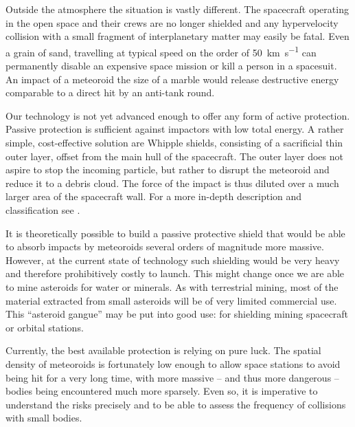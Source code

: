 
    Outside the atmosphere the situation is vastly different.
    The spacecraft operating in the open space and their crews are no longer shielded
    and any hypervelocity collision with a small fragment of interplanetary matter may easily be fatal.
    Even a grain of sand, travelling at typical speed on the order of \SI{50}{\kilo\metre\per\second} can permanently disable
    an expensive space mission or kill a person in a spacesuit.
    An impact of a meteoroid the size of a marble would release
    destructive energy comparable to a direct hit by an anti-tank round.

    Our technology is not yet advanced enough to offer any form of active protection.
    Passive protection is sufficient against impactors with low total energy.
    A rather simple, cost-effective solution are Whipple shields, consisting of a sacrificial thin outer layer,
    offset from the main hull of the spacecraft.
    The outer layer does not aspire to stop the incoming particle,
    but rather to disrupt the meteoroid and reduce it to a debris cloud.
    The force of the impact is thus diluted over a much larger area of the spacecraft wall.
    For a more in-depth description and classification see \citet{nasa-shield}.

    It is theoretically possible to build a passive protective shield that would be able to absorb impacts
    by meteoroids several orders of magnitude more massive.
    However, at the current state of technology such shielding would be very heavy and therefore prohibitively costly to launch.
    This might change once we are able to mine asteroids for water or minerals.
    As with terrestrial mining, most of the material extracted from small asteroids will be of very limited commercial use.
    This ``asteroid gangue'' may be put into good use: for shielding mining spacecraft or orbital stations.

    Currently, the best available protection is relying on pure luck. The spatial density of meteoroids is
    fortunately low enough to allow space stations to avoid being hit for a very long time,
    with more massive -- and thus more dangerous -- bodies being encountered much more sparsely.
    Even so, it is imperative to understand the risks precisely and to be able to assess the frequency
    of collisions with small bodies.

